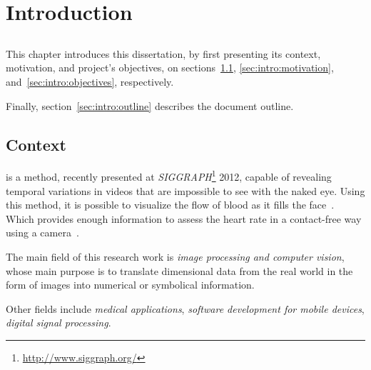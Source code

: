 \chapter{Introduction} \label{chap:intro}

\section*{}



This chapter introduces this dissertation, by first presenting its context,
motivation, and project's objectives, on sections~\ref{sec:intro:context},
\ref{sec:intro:motivation}, and~\ref{sec:intro:objectives}, respectively.

Finally, section~\ref{sec:intro:outline} describes the document outline.

\section{Context} \label{sec:intro:context}


\evm{} is a method, recently presented at
\emph{SIGGRAPH}\footnote{\url{http://www.siggraph.org/}} 2012, capable of
revealing temporal variations in videos that are impossible to see
with the naked eye. Using this method, it is possible to visualize
the flow of blood as it fills the face~\cite{Wu2012Eulerian}.
Which provides enough information to assess the heart rate in a
contact-free way using a camera~\cite{Wu2012Eulerian,
Poh2010Non, Poh2011Advancements}.

The main field of this research work is \emph{image processing
and computer vision}, whose main purpose is to translate dimensional
data from the real world in the form of images into numerical
or symbolical information.

Other fields include \emph{medical applications}, \emph{software
development for mobile devices}, \emph{digital signal processing}.


